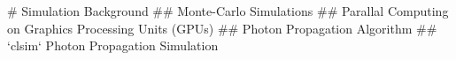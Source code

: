 # Simulation Background
## Monte-Carlo Simulations
## Parallal Computing on Graphics Processing Units (GPUs)
## Photon Propagation Algorithm
## `clsim` Photon Propagation Simulation
